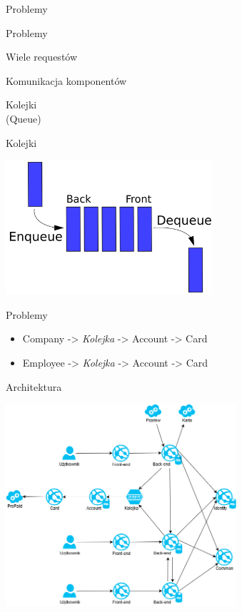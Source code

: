 \documentclass{beamer}
\begin{document}
\begin{frame}{}
	\begin{center}
		\Huge{Problemy}
	\end{center}
\end{frame}

\begin{frame}{Problemy}
	\begin{center}
		\Huge{Wiele requestów}
	\end{center}
\end{frame}

\begin{frame}{Komunikacja komponentów}
	\begin{center}
		\Huge{Kolejki}\\
		\huge{(Queue)}
	\end{center}
\end{frame}

\begin{frame}{Kolejki}
	\begin{center}
		\includegraphics[height=5cm]{queue1.png}
	\end{center}
\end{frame}

\begin{frame}{Problemy}
	\begin{huge}
		\begin{itemize}[<+->]
			\item Company -> \textit{Kolejka} -> Account -> Card
			\item Employee -> \textit{Kolejka} -> Account -> Card
		\end{itemize}
	\end{huge}
\end{frame}

\begin{frame}{Architektura}
	\begin{center}
		\includegraphics[height=7.5cm]{architektura6.png}
	\end{center}
\end{frame}
\end{document}
